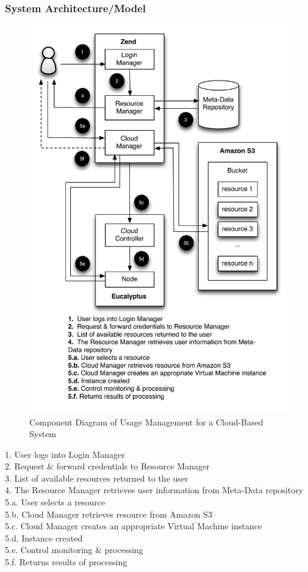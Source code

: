 \documentclass{acm_proc_article-sp}
\begin{document}
\subsubsection{System Architecture/Model}
\begin{figure}[h]
  \begin{center}
    \includegraphics[width=.49\textwidth]{component}
  \end{center}
  \caption{Component Diagram of Usage Management for a Cloud-Based System}
  \label{fig:convergence}
\end{figure}
1.  User logs into Login Manager\\
2.  Request \& forward credentials to Resource Manager\\
3.  List of available resources returned to the user\\
4.  The Resource Manager retrieves user information from Meta-Data repository\\
5.a. User selects a resource\\
5.b. Cloud Manager retrieves resource from Amazon S3\\
5.c. Cloud Manager creates an appropriate Virtual Machine instance\\
5.d. Instance created\\
5.e. Control monitoring \& processing\\
5.f. Returns results of processing
\end{document}
